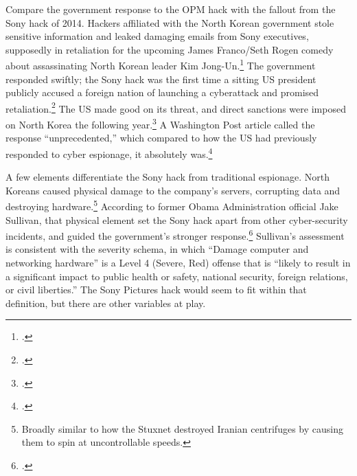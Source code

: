\documentclass{memoir}
\begin{document}
\begin{refsegment}

Compare the government response to the OPM hack with the fallout from the Sony hack of 2014. Hackers affiliated with the North Korean government stole sensitive information and leaked damaging emails from Sony executives, supposedly in retaliation for the upcoming James Franco/Seth Rogen comedy about assassinating North Korean leader Kim Jong-Un.\footcite{barnes_sony_2017} The government responded swiftly; the Sony hack was the first time a sitting US president publicly accused a foreign nation of launching a cyberattack and promised retaliation.\footcite{sanger_u.s._2016} The US made good on its threat, and direct sanctions were imposed on North Korea the following year.\footcite{lederman_us_2015} A Washington Post article called the response ``unprecedented,'' which compared to how the US had previously responded to cyber espionage, it absolutely was.\footcite{nakashima_why_2015}

A few elements differentiate the Sony hack from traditional espionage. North Koreans caused physical damage to the company's servers, corrupting data and destroying hardware.\footnote{Broadly similar to how the Stuxnet destroyed Iranian centrifuges by causing them to spin at uncontrollable speeds.} According to former Obama Administration official Jake Sullivan, that physical element set the Sony hack apart from other cyber-security incidents, and guided the government's stronger response.\footcite[Jake Sullivan served as the Deputy Assistant to the President and National Security Advisor to the Vice President. Piror to that, he was the Director of Policy Planning at the State Department.]{sullivan_personal_2019} Sullivan's assessment is consistent with the severity schema, in which ``Damage computer and networking hardware'' is a Level 4 (Severe, Red) offense that is ``likely to result in a significant impact to public health or safety, national security, foreign relations, or civil liberties.'' The Sony Pictures hack would seem to fit within that definition, but there are other variables at play.


\end{refsegment}
\end{document}
